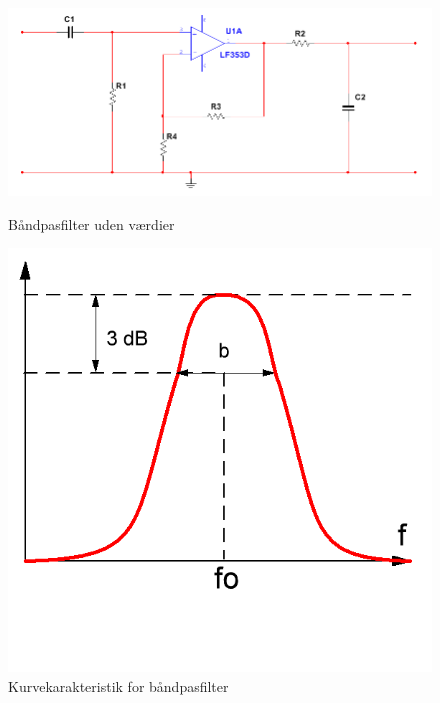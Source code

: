 \begin{figure}[htb]
  \begin{minipage}{0.45\textwidth}
    \centering
      \includegraphics[width=\textwidth]{billeder/HWdesign/BAANDPAS_UV}
      \caption{Båndpasfilter uden værdier}
    \label{fig:BAANDPAS_UV}
  \end{minipage}
  \hspace{0.1\textwidth}
  \begin{minipage}{0.45\textwidth}
    \centering
      \includegraphics[width=\textwidth]{billeder/HWdesign/BAANDPAS_KURVE}
      \caption{Kurvekarakteristik for båndpasfilter}
    \label{fig:BAANDPAS_KURVE}
  \end{minipage}
\end{figure}

